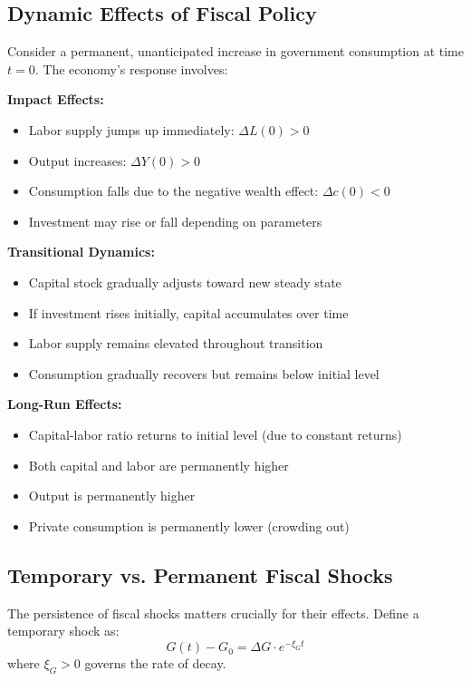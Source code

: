 \documentclass[\topdir/lecture\_notes.tex]{subfiles}
\begin{document}
\subsection{Dynamic Effects of Fiscal Policy}

Consider a permanent, unanticipated increase in government consumption at time $t = 0$. The economy's response involves:

\textbf{Impact Effects:}
\begin{itemize}
\item Labor supply jumps up immediately: $\Delta L(0) > 0$
\item Output increases: $\Delta Y(0) > 0$
\item Consumption falls due to the negative wealth effect: $\Delta c(0) < 0$
\item Investment may rise or fall depending on parameters
\end{itemize}

\textbf{Transitional Dynamics:}
\begin{itemize}
\item Capital stock gradually adjusts toward new steady state
\item If investment rises initially, capital accumulates over time
\item Labor supply remains elevated throughout transition
\item Consumption gradually recovers but remains below initial level
\end{itemize}

\textbf{Long-Run Effects:}
\begin{itemize}
\item Capital-labor ratio returns to initial level (due to constant returns)
\item Both capital and labor are permanently higher
\item Output is permanently higher
\item Private consumption is permanently lower (crowding out)
\end{itemize}

\subsection{Temporary vs. Permanent Fiscal Shocks}

The persistence of fiscal shocks matters crucially for their effects. Define a temporary shock as:
\begin{equation}
G(t) - G_0 = \Delta G \cdot e^{-\xi_G t}
\end{equation}
where $\xi_G > 0$ governs the rate of decay.
\end{document}
